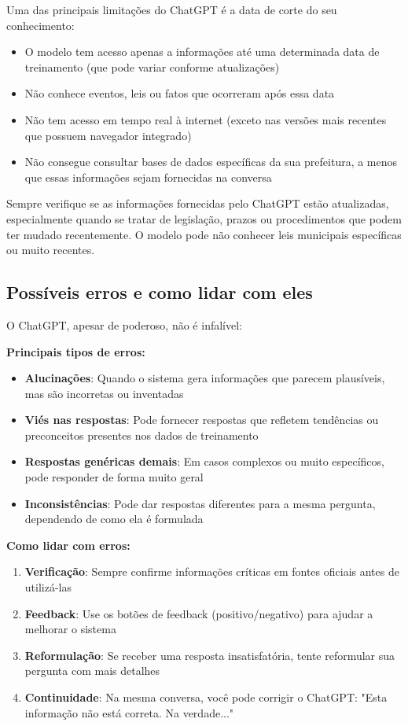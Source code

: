 \documentclass[12pt,a4paper]{book}
\begin{document}
Uma das principais limitações do ChatGPT é a data de corte do seu conhecimento:

\begin{itemize}
    \item O modelo tem acesso apenas a informações até uma determinada data de treinamento (que pode variar conforme atualizações)
    \item Não conhece eventos, leis ou fatos que ocorreram após essa data
    \item Não tem acesso em tempo real à internet (exceto nas versões mais recentes que possuem navegador integrado)
    \item Não consegue consultar bases de dados específicas da sua prefeitura, a menos que essas informações sejam fornecidas na conversa
\end{itemize}

\begin{tcolorbox}[atencao]
Sempre verifique se as informações fornecidas pelo ChatGPT estão atualizadas, especialmente quando se tratar de legislação, prazos ou procedimentos que podem ter mudado recentemente. O modelo pode não conhecer leis municipais específicas ou muito recentes.
\end{tcolorbox}

\subsection{Possíveis erros e como lidar com eles}

O ChatGPT, apesar de poderoso, não é infalível:

\textbf{Principais tipos de erros:}
\begin{itemize}
    \item \textbf{Alucinações}: Quando o sistema gera informações que parecem plausíveis, mas são incorretas ou inventadas
    \item \textbf{Viés nas respostas}: Pode fornecer respostas que refletem tendências ou preconceitos presentes nos dados de treinamento
    \item \textbf{Respostas genéricas demais}: Em casos complexos ou muito específicos, pode responder de forma muito geral
    \item \textbf{Inconsistências}: Pode dar respostas diferentes para a mesma pergunta, dependendo de como ela é formulada
\end{itemize}

\textbf{Como lidar com erros:}
\begin{enumerate}
    \item \textbf{Verificação}: Sempre confirme informações críticas em fontes oficiais antes de utilizá-las
    \item \textbf{Feedback}: Use os botões de feedback (positivo/negativo) para ajudar a melhorar o sistema
    \item \textbf{Reformulação}: Se receber uma resposta insatisfatória, tente reformular sua pergunta com mais detalhes
    \item \textbf{Continuidade}: Na mesma conversa, você pode corrigir o ChatGPT: "Esta informação não está correta. Na verdade..."
\end{enumerate}
\end{document}
